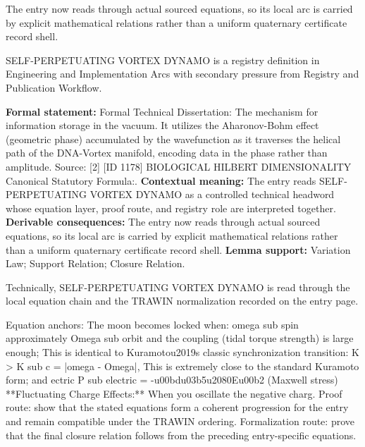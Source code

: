 The entry now reads through actual sourced equations, so its local arc is carried by explicit mathematical relations rather than a uniform quaternary certificate record shell.
\clearpage


\begingroup\small
{}
SELF-PERPETUATING VORTEX DYNAMO is a registry definition in Engineering and Implementation Arcs with secondary pressure from Registry and Publication Workflow.

\begingroup\footnotesize\setlength{\emergencystretch}{3em}\sloppy
\textbf{Formal statement:} Formal Technical Dissertation: The mechanism for information storage in the vacuum. It utilizes the Aharonov-Bohm effect (geometric phase) accumulated by the wavefunction as it traverses the helical path of the DNA-Vortex manifold, encoding data in the phase rather than amplitude. Source: [2] [ID 1178] BIOLOGICAL HILBERT DIMENSIONALITY Canonical Statutory Formula:. \textbf{Contextual meaning:} The entry reads SELF-PERPETUATING VORTEX DYNAMO as a controlled technical headword whose equation layer, proof route, and registry role are interpreted together. \textbf{Derivable consequences:} The entry now reads through actual sourced equations, so its local arc is carried by explicit mathematical relations rather than a uniform quaternary certificate record shell. \textbf{Lemma support:} Variation Law; Support Relation; Closure Relation.\par
\endgroup

Technically, SELF-PERPETUATING VORTEX DYNAMO is read through the local equation chain and the TRAWIN normalization recorded on the entry page.

Equation anchors: The moon becomes locked when: omega sub spin approximately Omega sub orbit and the coupling (tidal torque strength) is large enough; This is identical to Kuramotou2019s classic synchronization transition: K > K sub c = |omega - Omega|, This is extremely close to the standard Kuramoto form; and ectric P sub electric = -u00bdu03b5u2080Eu00b2 (Maxwell stress) **Fluctuating Charge Effects:** When you oscillate the negative charg. Proof route: show that the stated equations form a coherent progression for the entry and remain compatible under the TRAWIN ordering. Formalization route: prove that the final closure relation follows from the preceding entry-specific equations.

